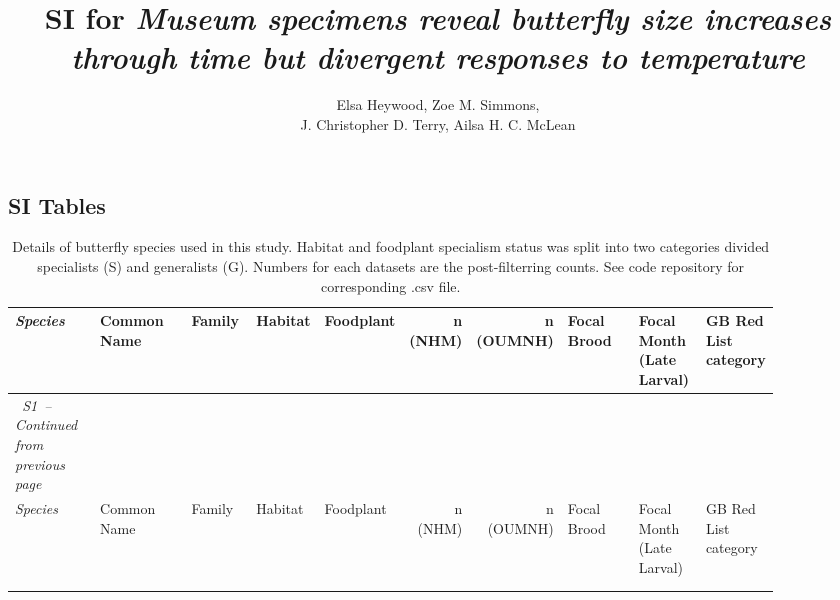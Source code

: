 \documentclass[a4paper,11pt]{article}
\title{SI for \emph{Museum specimens reveal butterfly size increases through time but divergent responses to temperature}}
\author{Elsa Heywood,  Zoe M. Simmons,\\ J. Christopher D. Terry, Ailsa H. C. McLean}
\date{}
\begin{document}
\maketitle

\renewcommand{\thetable}{S1} %
\begin{landscape}
\section{SI Tables}

\footnotesize %
\setlength{\tabcolsep}{4pt} %
\renewcommand{\arraystretch}{1.05} %

\begin{longtable}{@{}
  >{\itshape}p{0.15\linewidth}  %
  p{0.18\linewidth}  %
  p{0.10\linewidth}  %
  p{0.05\linewidth}  %
  p{0.06\linewidth}  %
  r                   %
  r                   %
  p{0.15\linewidth}  %
  p{0.10\linewidth}  %
  p{0.10\linewidth}  %
 @{}}

\caption{Details of butterfly species used in this study. Habitat and foodplant specialism status was split into two categories divided  specialists (S) and generalists (G). Numbers for each datasets are the post-filterring counts. See code repository for corresponding .csv file.}\\
\toprule
Species & Common Name & Family & Habitat & Foodplant & n (NHM) & n (OUMNH) & Focal Brood & Focal Month (Late Larval) & GB Red List category \\
\midrule
\endfirsthead

\multicolumn{10}{c}%
{\tablename\ \thetable\ -- \textit{Continued from previous page}}\\
\toprule
Species & Common Name & Family & Habitat & Foodplant & n (NHM) & n (OUMNH) & Focal Brood & Focal Month (Late Larval) & GB Red List category \\
\midrule
\endhead

\midrule
\multicolumn{10}{r}{\textit{Continued on next page}}\\
\endfoot

\bottomrule
\endlastfoot


\end{longtable}
\end{landscape}
\end{document}
